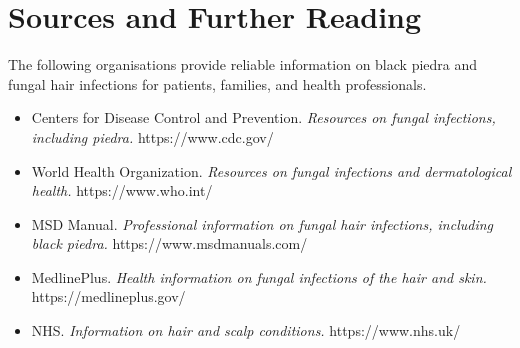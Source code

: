 \section*{Sources and Further Reading}
The following organisations provide reliable information on black piedra and fungal hair infections for patients, families, and health professionals.

\begin{itemize}
    \item Centers for Disease Control and Prevention. \textit{Resources on fungal infections, including piedra.} https://www.cdc.gov/
    \item World Health Organization. \textit{Resources on fungal infections and dermatological health.} https://www.who.int/
    \item MSD Manual. \textit{Professional information on fungal hair infections, including black piedra.} https://www.msdmanuals.com/
    \item MedlinePlus. \textit{Health information on fungal infections of the hair and skin.} https://medlineplus.gov/
    \item NHS. \textit{Information on hair and scalp conditions.} https://www.nhs.uk/
\end{itemize}
